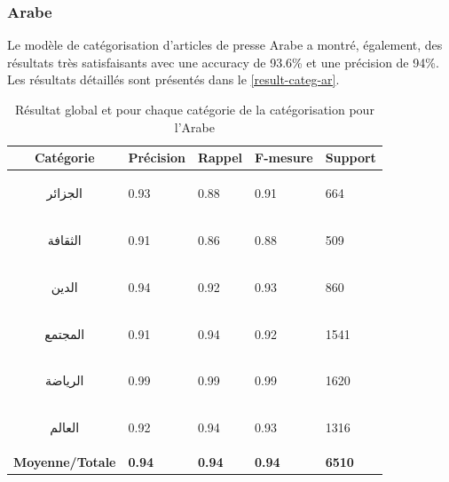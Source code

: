    \subsubsection{Arabe}
    Le modèle de catégorisation d'articles de presse Arabe a montré, également, des résultats très satisfaisants avec une accuracy de 93.6\% et une précision de 94\%. Les résultats détaillés sont présentés dans le \autoref{result-categ-ar}.
    \begin{table}[H]
        \begin{center}
            \begin{tabular}{|c|C{2cm}|C{2cm}|C{2cm}|C{2cm}|}
                \hline
                \textbf{Catégorie} &  \textbf{Précision} &  \textbf{Rappel} &  \textbf{F-mesure} &  \textbf{Support} \\
                \hline
                \begin{arab}الجزائر\end{arab} & 0.93 & 0.88 & 0.91 & 664 \\
                \begin{arab}الثقافة\end{arab} & 0.91 & 0.86 & 0.88 & 509 \\
                \begin{arab}الدين\end{arab} & 0.94 & 0.92 & 0.93 & 860 \\
                \begin{arab}المجتمع\end{arab} & 0.91 & 0.94 & 0.92 & 1541 \\
                \begin{arab}الرياضة\end{arab} & 0.99 & 0.99 & 0.99 & 1620 \\
                \begin{arab}العالم\end{arab} & 0.92 & 0.94 & 0.93 & 1316 \\                      
                \textbf{Moyenne/Totale} & \textbf{0.94} & \textbf{0.94} & \textbf{0.94} & \textbf{6510} \\
                \hline
            \end{tabular}
        \end{center}
        \caption{Résultat global et pour chaque catégorie de la catégorisation pour l'Arabe}
        \label{result-categ-ar}
    \end{table}

